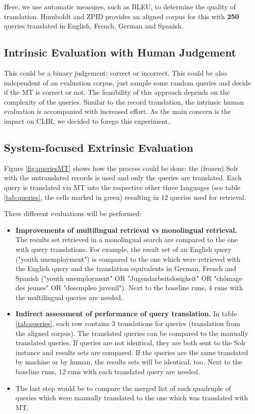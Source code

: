 \documentclass[a4paper,11pt]{article}
\begin{document}
Here, we use automatic measures, such as BLEU, to determine the quality of translation. Humboldt and ZPID provides an aligned corpus for this with \textbf{250} queries translated in  English, French, German and Spanish. 

\subsection{Intrinsic Evaluation with Human Judgement}
This could be a binary judgement: correct or incorrect.
This could be also independent of an evaluation corpus, just sample some random queries and decide if the MT is correct or not. The feasibility of this approach depends on the complexity of the queries. Similar to the record translation, the intrinsic human evaluation is accompanied with increased effort. As the main concern is the impact on CLIR, we decided to forego this experiment. 

\subsection{System-focused Extrinsic Evaluation}
Figure \ref{fig:queriesMT} shows how the process could be done: the (frozen) Solr with the untranslated records is used and only the queries are translated. Each query is translated via MT into the respective other three languages (see table \ref{tab:queries}, the cells marked in green) resulting in 12 queries used for retrieval.

Three different evaluations will be performed: 
\begin{itemize}
\item \textbf{Improvements of multilingual  retrieval vs monolingual retrieval.} The results set retrieved in a monolingual search are compared to the one with query translations. For example, the result set of an English query ("youth unemployment") is compared to the one which were retrieved with the English query and the translation equivalents in German, French and Spanish ("youth unemployment" OR "Jugendarbeitslosigkeit" OR "chômage des jeunes" OR "desempleo juvenil"). Next to the baseline runs, 4 runs with the multilingual queries are needed.
\item \textbf{Indirect assessment of performance of query translation.} In table \ref{tab:queries}, each row contains 3 translations for queries (translation from the aligned corpus). The translated queries can be compared to the manually translated queries. If queries are not identical, they are both sent to the Solr instance and results sets are compared. If the queries are the same translated by machine or by human, the results sets will be identical, too. Next to the baseline runs, 12 runs with each translated query are needed.
\item The last step would be to compare the merged list of each quadruple of queries which were manually translated to the one which was translated with MT.
\end{itemize}
 
\end{document}

